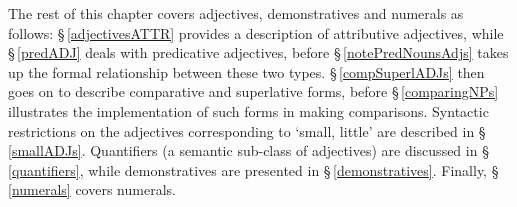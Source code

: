 The rest of this chapter covers adjectives, demonstratives and numerals as follows: §\,\ref{adjectivesATTR} provides a description of attributive adjectives, %
while §\,\ref{predADJ} deals with predicative adjectives, before §\,\ref{notePredNounsAdjs} takes up the formal relationship between these two types. 
§\,\ref{compSuperlADJs} then goes on to describe comparative and superlative forms, 
before §\,\ref{comparingNPs} illustrates the implementation of such forms in making comparisons. 
Syntactic restrictions on the adjectives corresponding to ‘small, little’ are described in §\,\ref{smallADJs}. 
Quantifiers (a semantic sub-class of adjectives) are discussed in §\,\ref{quantifiers}, while 
demonstratives are presented in §\,\ref{demonstratives}. 
Finally, §\,\ref{numerals} covers numerals. %





